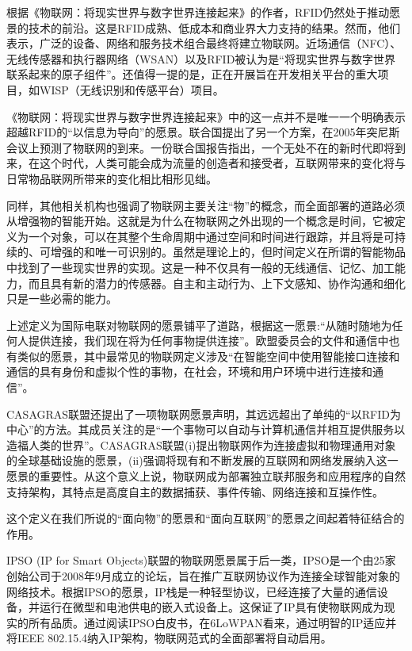 \documentclass[12pt,a4paper]{article}%
\begin{document}
根据《物联网：将现实世界与数字世界连接起来》的作者，RFID仍然处于推动愿景的技术的前沿。这是RFID成熟、低成本和商业界大力支持的结果。然而，他们表示，广泛的设备、网络和服务技术组合最终将建立物联网。近场通信（NFC）、无线传感器和执行器网络（WSAN）以及RFID被认为是“将现实世界与数字世界联系起来的原子组件”。还值得一提的是，正在开展旨在开发相关平台的重大项目，如WISP（无线识别和传感平台）项目。

《物联网：将现实世界与数字世界连接起来》中的这一点并不是唯一一个明确表示超越RFID的“以信息为导向”的愿景。联合国提出了另一个方案，在2005年突尼斯会议上预测了物联网的到来。一份联合国报告指出，一个无处不在的新时代即将到来，在这个时代，人类可能会成为流量的创造者和接受者，互联网带来的变化将与日常物品联网所带来的变化相比相形见绌。

同样，其他相关机构也强调了物联网主要关注“物”的概念，而全面部署的道路必须从增强物的智能开始。这就是为什么在物联网之外出现的一个概念是时间，它被定义为一个对象，可以在其整个生命周期中通过空间和时间进行跟踪，并且将是可持续的、可增强的和唯一可识别的。虽然是理论上的，但时间定义在所谓的智能物品中找到了一些现实世界的实现。这是一种不仅具有一般的无线通信、记忆、加工能力，而且具有新的潜力的传感器。自主和主动行为、上下文感知、协作沟通和细化只是一些必需的能力。

上述定义为国际电联对物联网的愿景铺平了道路，根据这一愿景:“从随时随地为任何人提供连接，我们现在将为任何事物提供连接”。欧盟委员会的文件和通信中也有类似的愿景，其中最常见的物联网定义涉及“在智能空间中使用智能接口连接和通信的具有身份和虚拟个性的事物，在社会，环境和用户环境中进行连接和通信”。

CASAGRAS联盟还提出了一项物联网愿景声明，其远远超出了单纯的“以RFID为中心”的方法。其成员关注的是“一个事物可以自动与计算机通信并相互提供服务以造福人类的世界”。CASAGRAS联盟(i)提出物联网作为连接虚拟和物理通用对象的全球基础设施的愿景，(ii)强调将现有和不断发展的互联网和网络发展纳入这一愿景的重要性。从这个意义上说，物联网成为部署独立联邦服务和应用程序的自然支持架构，其特点是高度自主的数据捕获、事件传输、网络连接和互操作性。

这个定义在我们所说的“面向物”的愿景和“面向互联网”的愿景之间起着特征结合的作用。

IPSO (IP for Smart Objects)联盟的物联网愿景属于后一类，IPSO是一个由25家创始公司于2008年9月成立的论坛，旨在推广互联网协议作为连接全球智能对象的网络技术。根据IPSO的愿景，IP栈是一种轻型协议，已经连接了大量的通信设备，并运行在微型和电池供电的嵌入式设备上。这保证了IP具有使物联网成为现实的所有品质。通过阅读IPSO白皮书，在6LoWPAN看来，通过明智的IP适应并将IEEE 802.15.4纳入IP架构，物联网范式的全面部署将自动启用。
\end{document}
